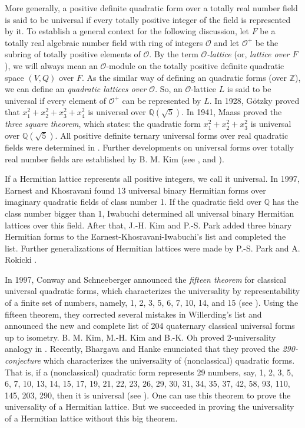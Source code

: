 \documentclass[a4paper,10pt,reqno]{amsart}
\begin{document}
More generally, a positive definite quadratic form over a totally real number field is said to be
universal if every totally positive integer of the field is represented by it. To establish a
general context for the following discussion, let $F$ be a totally real algebraic number field with
ring of integers ${\mathcal{O}}$ and let ${\mathcal{O}}^{+}$ be the subring of totally positive elements of
${\mathcal{O}}$. By the term \emph{ ${\mathcal{O}}$-lattice} (or, \emph{lattice over $F$}), we will always mean an
${\mathcal{O}}$-module on the totally positive definite quadratic space $(V,Q)$ over $F$. As the similar
way of defining an quadratic forms (over ${\mathbb{Z}}$), we can define an \emph{quadratic lattices over
${\mathcal{O}}$}. So, an ${\mathcal{O}}$-lattice $L$ is said to be universal if every element of ${\mathcal{O}}^{+}$ can be
represented by $L$. In 1928, G\"otzky \cite{fG_28} proved that $x_1^2 + x_2^2 + x_3^2 + x_4^2$ is
universal over $\mathbb{Q}(\sqrt{5})$. In 1941, Maass \cite{hM_41} proved the \emph{three square
theorem}, which states: the quadratic form $x_1^2 + x_2^2 + x_3^2$ is universal over ${\mathbb{Q}(\sqrt{{5}})}$. All
positive definite ternary universal forms over real quadratic fields were determined in
\cite{wkC_mhK_sR_96}. Further developments on universal forms over totally real number fields are
established by B. M. Kim (see \cite{bmK1}, \cite{bmK_99} and \cite{bmK_00}).

If a Hermitian lattice represents all positive integers, we call it universal. In 1997, Earnest and
Khosravani \cite{agE_aK_97} found 13 universal binary Hermitian forms over imaginary quadratic
fields of class number 1. If the quadratic field over $\mathbb{Q}$ has the class number bigger than
1, Iwabuchi \cite{hI_00} determined all universal binary Hermitian lattices over this field. After
that, J.-H. Kim and P.-S. Park \cite{jhK_psP} added three binary Hermitian forms to the
Earnest-Khosravani-Iwabuchi's list and completed the list. Further generalizations of Hermitian
lattices were made by P.-S. Park \cite{psP_05} and A. Rokicki \cite{aR_05}.

In 1997, Conway and Schneeberger announced the \emph{fifteen
theorem} for classical universal quadratic forms, which
characterizes the universality by representability of a finite set
of numbers, namely, 1, 2, 3, 5, 6, 7, 10, 14, and 15 (see
\cite{jhC_wS}). Using the fifteen theorem, they corrected several
mistakes in Willerding's list and announced the new and complete
list of 204 quaternary classical universal forms up to isometry. B.
M. Kim, M.-H. Kim and B.-K. Oh proved 2-universality analogy in
\cite{bmK_mhK_bkO_99}. Recently, Bhargava and Hanke enunciated that
they proved the \emph{290-conjecture} which characterizes the
universality of (nonclassical) quadratic forms. That is, if a
(nonclassical) quadratic form represents 29 numbers, say, 1, 2, 3,
5, 6, 7, 10, 13, 14, 15, 17, 19, 21, 22, 23, 26, 29, 30, 31, 34, 35,
37, 42, 58, 93, 110, 145, 203, 290, then it is universal (see
\cite{jH_06}). One can use this theorem to prove the universality of
a Hermitian lattice. But we succeeded in proving the universality of
a Hermitian lattice without this big theorem.
\end{document}

